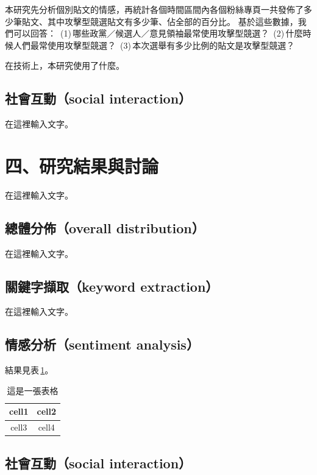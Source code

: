 \documentclass[letterpaper, 10pt, conference]{ieeeconf}   %
\begin{document}
\begin{CJK*}{UTF8}{bsmi}
本研究先分析個別貼文的情感，再統計各個時間區間內各個粉絲專頁一共發佈了多少筆貼文、其中攻擊型競選貼文有多少筆、佔全部的百分比。
基於這些數據，我們可以回答：
\,(1)\,哪些政黨／候選人／意見領袖最常使用攻擊型競選？
\,(2)\,什麼時候人們最常使用攻擊型競選？
\,(3)\,本次選舉有多少比例的貼文是攻擊型競選？

在技術上，本研究使用了什麼。

\subsection*{社會互動（social interaction）}

在這裡輸入文字。

\section*{四、研究結果與討論}

在這裡輸入文字。

\subsection*{總體分佈（overall distribution）}

在這裡輸入文字。

\subsection*{關鍵字擷取（keyword extraction）}

在這裡輸入文字。

\subsection*{情感分析（sentiment analysis）}

結果見表\,\ref{t1}。

\begin{table}[!htbp]
\caption{這是一張表格}
\label{t1}
\begin{center}
\begin{tabular}{|c|c|}
\hline
cell1 & cell2 \\
\hline
cell3 & cell4 \\
\hline
\end{tabular}
\end{center}
\end{table}

\subsection*{社會互動（social interaction）}


\end{CJK*}
\end{document}
